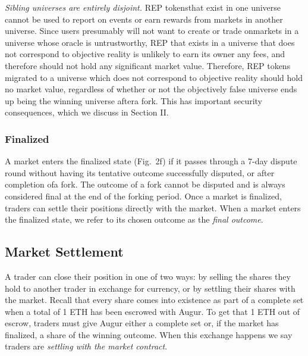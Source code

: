 \documentclass[12pt,floatfix,reprint,nofootinbib,amsmath,amssymb,epsfig,pre,floats,letterpaper,groupedaffiliation]{revtex4-1}
\theoremstyle{definition}
\theoremstyle{definition}
\begin{document}
\textit{Sibling universes are entirely disjoint.} REP tokens\linebreak that exist in one universe cannot be used to report on events or earn rewards from markets in another universe. Since users presumably will not want to create or trade on\linebreak markets in a universe whose oracle is untrustworthy, REP that exists in a universe that does not correspond to objective reality is unlikely to earn its owner any fees, and therefore should not hold any significant market value. Therefore, REP tokens migrated to a universe which does not correspond to objective reality should hold no market value, regardless of whether or not the objectively false universe ends up being the winning universe after\linebreak a fork. This has important security consequences, which we discuss in Section II.

\subsubsection{Finalized}

A market enters the finalized state (Fig.~2f) if it passes through a 7-day dispute round without having its tenta\-tive outcome successfully disputed, or after completion of\linebreak a fork. The outcome of a fork cannot be disputed and is always considered final at the end of the forking period. Once a market is finalized, traders can settle their po\-sitions directly with the market. When a market enters the finalized state, we refer to its chosen outcome as the \textit{final outcome}.

\subsection{Market Settlement}\label{section:settlement}

A trader can close their position in one of two ways: by selling the shares they hold to another trader in exchange for currency, or by settling their shares with the market. Recall that every share comes into existence as part of a complete set when a total of 1 ETH has been escrowed with Augur. To get that 1 ETH out of escrow, traders must give Augur either a complete set or, if the market has finalized, a share of the winning outcome. When this exchange happens we say traders are \textit{settling with the market contract}.
\end{document}
